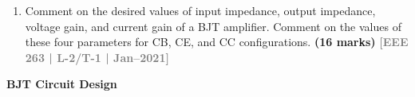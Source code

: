 \documentclass[12pt,a4paper]{article}
\newcommand{\yr}[1]{\hfill\textcolor{gray}{\small\textbf{[#1]}}}
\newcommand{\mk}[1]{\textcolor{orange!70!black}{\small\textbf{(#1 marks)}}}
\newcommand{\subtopic}[2]{%
  \vspace{10pt}
  \noindent\begin{tcolorbox}[colback=#1!8,colframe=#1,boxrule=0.6pt,arc=4pt,
    left=6pt,right=6pt,top=4pt,bottom=4pt]
    \small\bfseries\textcolor{#1}{#2}
  \end{tcolorbox}
  \vspace{2pt}
}
\begin{document}
\begin{enumerate}
\begin{enumerate}
\item In the circuit of the previous question, if $R_1=40\,\text{k}\Omega$, $R_2=10\,\text{k}\Omega$, $R_c=1.5\,\text{k}\Omega$, $R_E=1\,\text{k}\Omega$, $V_{cc}=12\,\text{V}$, and $\beta=1000$, calculate the biasing point. How can the values of $R_1$ and $R_2$ be changed for a good biasing design?
\mk{10} \yr{EEE 263 | L-2/T-1 | 2014--15}

\end{enumerate}


\item Comment on the desired values of input impedance, output impedance, voltage gain, and current gain of a BJT amplifier. Comment on the values of these four parameters for CB, CE, and CC configurations.
\mk{16} \yr{EEE 263 | L-2/T-1 | Jan--2021}

\end{enumerate}

\subtopic{cA}{BJT Circuit Design}
\label{sub:s2-design}
\end{document}
